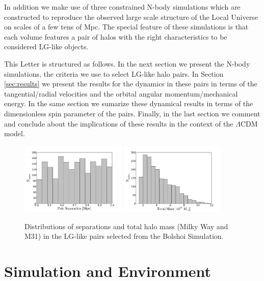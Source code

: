 \documentclass{emulateapj}
\begin{document}
In addition we make use of three  constrained N-body simulations which
are constructed to reproduce the observed large scale structure of the
Local Universe on scales of a few tens of Mpc. The special feature of
these simulations is that each volume features a pair of halos with
the right characteristics to be considered LG-like objects. 

This Letter is structured as follows. In the next section we present
the N-body simulations, the criteria we use to select LG-like halo
pairs. In Section \ref{sec:results} we present the results for the
dynamics in these pairs in terms of the tangential/radial velocities
and the orbital angular momentum/mechanical energy. In the same
section we sumarize these dynamical results in terms of the
dimensionless spin parameter of the pairs. Finally, in the last
section we comment and conclude about the implications of these
results in the context of the $\Lambda$CDM model. 





\label{subsec:lg-sample}
\begin{figure}
\begin{center}
\includegraphics[keepaspectratio=true,width=0.45\textwidth]{./figures/separation_BDM.pdf}
\includegraphics[keepaspectratio=true,width=0.45\textwidth]{./figures/total_mass_BDM.pdf}
\caption{\label{fig:distros} Distributions of separations and total
  halo mass (Milky Way and M31) in the LG-like pairs selected from the
  Bolshoi Simulation.} 
\end{center}
\end{figure}

\section{Simulation and Environment}
\label{sec:methods}
\end{document}
